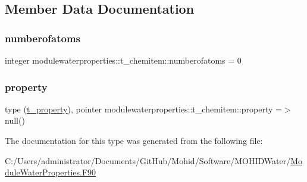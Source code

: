 \subsection{Member Data Documentation}
\mbox{\label{structmodulewaterproperties_1_1t__chemitem_a3a06bd917d542c6d93f50a4b72485b54}} 
\subsubsection{\texorpdfstring{numberofatoms}{numberofatoms}}
{\footnotesize\ttfamily integer modulewaterproperties\+::t\+\_\+chemitem\+::numberofatoms = 0\hspace{0.3cm}{\ttfamily [private]}}

\mbox{\label{structmodulewaterproperties_1_1t__chemitem_a51e6107fc3fe61150c42181dbc0014b0}} 
\subsubsection{\texorpdfstring{property}{property}}
{\footnotesize\ttfamily type (\mbox{\hyperlink{structmodulewaterproperties_1_1t__property}{t\+\_\+property}}), pointer modulewaterproperties\+::t\+\_\+chemitem\+::property =$>$ null()\hspace{0.3cm}{\ttfamily [private]}}



The documentation for this type was generated from the following file\+:\begin{DoxyCompactItemize}
\item 
C\+:/\+Users/administrator/\+Documents/\+Git\+Hub/\+Mohid/\+Software/\+M\+O\+H\+I\+D\+Water/\mbox{\hyperlink{_module_water_properties_8_f90}{Module\+Water\+Properties.\+F90}}\end{DoxyCompactItemize}
